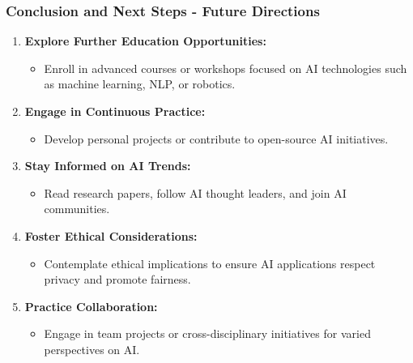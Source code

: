 \documentclass{beamer}
\begin{document}
\begin{frame}[fragile]
    \frametitle{Conclusion and Next Steps - Future Directions}
    \begin{enumerate}
        \item \textbf{Explore Further Education Opportunities:}
        \begin{itemize}
            \item Enroll in advanced courses or workshops focused on AI technologies such as machine learning, NLP, or robotics.
        \end{itemize}
        
        \item \textbf{Engage in Continuous Practice:}
        \begin{itemize}
            \item Develop personal projects or contribute to open-source AI initiatives.
        \end{itemize}

        \item \textbf{Stay Informed on AI Trends:}
        \begin{itemize}
            \item Read research papers, follow AI thought leaders, and join AI communities.
        \end{itemize}

        \item \textbf{Foster Ethical Considerations:}
        \begin{itemize}
            \item Contemplate ethical implications to ensure AI applications respect privacy and promote fairness.
        \end{itemize}

        \item \textbf{Practice Collaboration:}
        \begin{itemize}
            \item Engage in team projects or cross-disciplinary initiatives for varied perspectives on AI.
        \end{itemize}
    \end{enumerate}
\end{frame}
\end{document}
